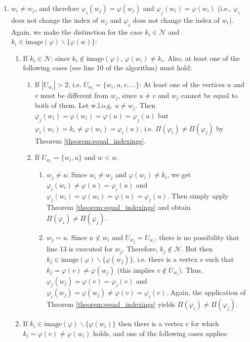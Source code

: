 \documentclass[11pt,a4paper]{article}
\numberwithin{equation}{section}
\newcommand{\idx}{\varphi}
\newcommand{\image}{\mathrm{image}}
\begin{document}
\begin{appendixproof}
\begin{enumerate}
\begin{enumerate}
        \end{enumerate}
        \item $w_i \neq w_j$, and therefore $\idx_i(w_j) = \idx(w_j)$ and $\idx_j(w_i) = \idx(w_i)$ (i.e., $\idx_i$ does not change the index of $w_j$ and $\idx_j$ does not change the index of $w_i$). Again, we make the distinction for the case $k_i \in \mathcal{N}$ and $k_i \in \image(\idx)\backslash \{ \idx(w) \}$:
        \begin{enumerate}
            \item If $k_i \in \mathcal{N}$: since $k_i \not\in \image(\idx)$, $\idx(w_i) \neq k_i$. Also, at least one of the following cases (see line 10 of the algorithm) must hold:
            \begin{enumerate}
                \item If $|U_{w_i} | > 2$, i.e. $U_{w_i} = \{ w_i, u, v, \dots \}$: At least one of the vertices $u$ and $v$ must be different from $w_j$, since $u \neq v$ and $w_j$ cannot be equal to both of them. Let w.l.o.g. $u \neq w_j$. Then $\idx_j(w_i) = \idx(w_i) = \idx(u) = \idx_j(u)$ but $\idx_i(w_i) = k_i \neq \idx(w_i) = \idx_i(u)$, i.e. $\Pi(\idx_i) \neq \Pi(\idx_j)$ by Theorem \ref{theorem:equal_indexings}.
                \item If $U_{w_i} = \{w_i, u \}$ and $w < u$: 
                \begin{enumerate}
                    \item $w_j \neq u$: Since $w_i \neq w_j$ and $\idx(w_i) \neq k_i$, we get $\idx_i(w_i) \neq \idx(u) = \idx_i(u)$ and $\idx_j(w_i) = \idx(w_i) = \idx(u) = \idx_j(u)$. Then simply apply Theorem \ref{theorem:equal_indexings} and obtain $\Pi(\idx_i) \neq \Pi(\idx_j)$.
                    \item $w_j = u$. Since $u \not< w_i$ and $U_{w_j} = U_{w_i}$, there is no possibility that line 13 is executed for $w_j$. Therefore, $k_j \not\in \mathcal{N}$. But then $k_j \in \image(\idx)\backslash \{ \idx(w_j) \}$, i.e. there is a vertex $v$ such that $k_j = \idx(v) \neq \idx(w_j)$ (this implies $v \not\in U_{w_i}$). Thus, $\idx_j(w_j) = \idx(v)=\idx_j(v)$ and $\idx_i(w_j) = \idx(w_j) \neq \idx(v) = \idx_i(v)$. Again, the application of Theorem \ref{theorem:equal_indexings} yields $\Pi(\idx_i) \neq \Pi(\idx_j)$.
                \end{enumerate}
            \end{enumerate}
            \item If $k_i \in \image(\idx)\backslash \{ \idx(w_i) \}$ then there is a vertex $v$ for which $k_i = \idx(v) \neq \idx(w_i)$ holds, and one of the following cases applies:

\end{enumerate}
\end{enumerate}
\end{appendixproof}
\end{document}
